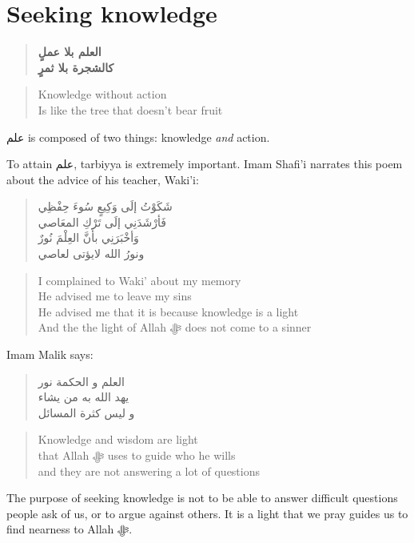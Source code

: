 \documentclass[
]{book}
\begin{document}
\hypertarget{seeking-knowledge}{%
\section{Seeking knowledge}\label{seeking-knowledge}}

\begin{quote}
\textbf{العلم بلا عملٍ}\\
\textbf{كالشجرة بلا ثمرٍ}
\end{quote}

\begin{quote}
Knowledge without action\\
Is like the tree that doesn't bear fruit
\end{quote}

علم is composed of two things: knowledge \emph{and} action.

To attain علم, tarbiyya is extremely important. Imam Shafi'i narrates this poem about the advice of his teacher, Waki'i:

\begin{quote}
شَكَوْتُ إلَى وَكِيعٍ سُوءَ حِفْظِي\\
فَأرْشَدَنِي إلَى تَرْكِ المعَاصي\\
وَأخْبَرَنِي بأَنَّ العِلْمَ نُورٌ\\
ونورُ الله لايؤتى لعاصي
\end{quote}

\begin{quote}
I complained to Waki' about my memory\\
He advised me to leave my sins\\
He advised me that it is because knowledge is a light\\
And the the light of Allah ﷻ does not come to a sinner
\end{quote}

Imam Malik says:

\begin{quote}
العلم و الحكمة نور\\
يهد الله به من يشاء\\
و ليس كثرة المسائل
\end{quote}

\begin{quote}
Knowledge and wisdom are light\\
that Allah ﷻ uses to guide who he wills\\
and they are not answering a lot of questions
\end{quote}

The purpose of seeking knowledge is not to be able to answer difficult questions people ask of us, or to argue against others. It is a light that we pray guides us to find nearness to Allah ﷻ.
\end{document}

